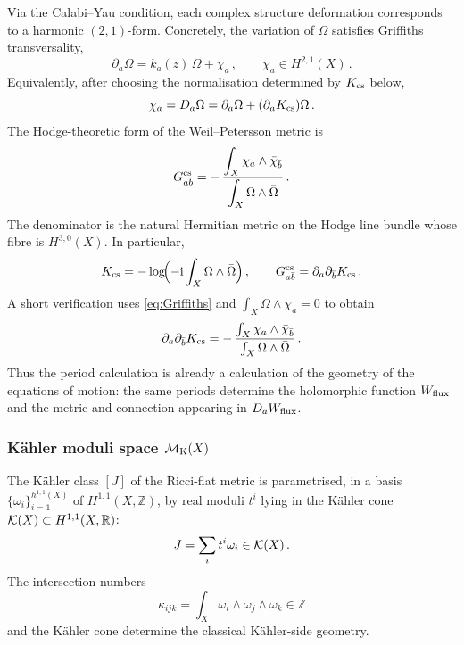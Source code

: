 Via the Calabi--Yau condition, each complex structure deformation
corresponds to a harmonic $(2,1)$-form.  
Concretely, the variation of $\Omega$ satisfies Griffiths
transversality,
\begin{equation}\label{eq:Griffiths}
    \partial_a\Omega
    =
    k_a(z)\,\Omega+\chi_a\, ,
    \qquad
    \chi_a\in H^{2,1}(X)\, .
\end{equation}
Equivalently, after choosing the normalisation determined by
$K_{\rm cs}$ below,
\begin{equation}
    \chi_a
    =
    D_a\Omega
    =
    \partial_a\Omega+(\partial_aK_{\rm cs})\Omega\, .
\end{equation}
The Hodge-theoretic form of the Weil--Petersson metric is
\begin{equation}\label{eq:WP-cs-Hodge}
    G^{\rm cs}_{a\bar b}
    =
    -\,\frac{\displaystyle\int_X
        \chi_a\wedge\bar\chi_{\bar b}}
        {\displaystyle\int_X
        \Omega\wedge\bar\Omega}\, .
\end{equation}
The denominator is the natural Hermitian metric on the Hodge line
bundle whose fibre is $H^{3,0}(X)$.  In particular,
\begin{equation}\label{eq:K-cs-WP}
    K_{\rm cs}
    =
    -\log\!\Bigl(
        -\mathrm{i}\int_X\Omega\wedge\bar\Omega
    \Bigr)\, ,
    \qquad
    G^{\rm cs}_{a\bar b}
    =
    \partial_a\partial_{\bar b}K_{\rm cs}\, .
\end{equation}
A short verification uses \eqref{eq:Griffiths} and
$\int_X\Omega\wedge\chi_a=0$ to obtain
\begin{equation}
    \partial_a\partial_{\bar b}K_{\rm cs}
    =
    -\,\frac{\int_X\chi_a\wedge\bar\chi_{\bar b}}
            {\int_X\Omega\wedge\bar\Omega}\, .
\end{equation}
Thus the period calculation is already a calculation of the
geometry of the equations of motion: the same periods determine the
holomorphic function $W_{\rm flux}$ and the metric and connection
appearing in $D_a W_{\rm flux}$.



\subsubsection*{K\"ahler moduli space \texorpdfstring{$\mathcal{M}_{\rm K}(X)$}{MK}}

The K\"ahler class $[J]$ of the Ricci-flat metric is parametrised,
in a basis $\{\omega_i\}_{i=1}^{h^{1,1}(X)}$ of
$H^{1,1}(X,\mathbb{Z})$, by real moduli $t^i$ lying in the K\"ahler
cone $\mathcal{K}(X)\subset H^{1,1}(X,\mathbb{R})$:
\begin{equation}
    J=\sum_i t^i\omega_i\in\mathcal{K}(X)\, .
\end{equation}
The intersection numbers
\begin{equation}
    \kappa_{ijk}
    =
    \int_X\omega_i\wedge\omega_j\wedge\omega_k
    \in\mathbb{Z}
\end{equation}
and the K\"ahler cone determine the classical K\"ahler-side
geometry.  


